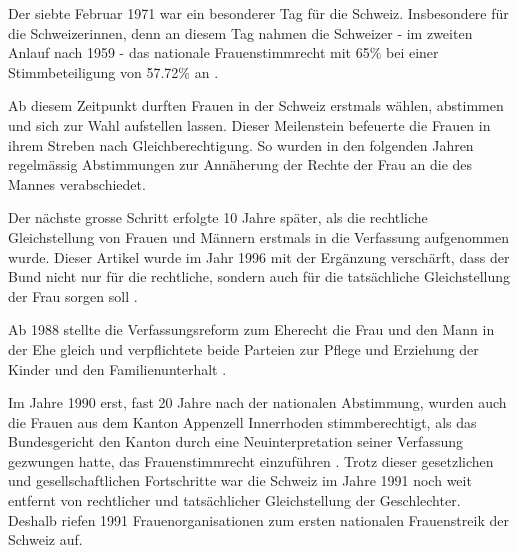 
Der siebte Februar 1971 war ein besonderer Tag für die Schweiz. Insbesondere für
die Schweizerinnen, denn an diesem Tag nahmen die Schweizer - im zweiten Anlauf nach 1959 - das
nationale Frauenstimmrecht mit 65\% bei einer Stimmbeteiligung von 57.72\% an
\cite{frauenstimmrecht}.

Ab diesem Zeitpunkt durften Frauen in der Schweiz erstmals wählen, abstimmen und sich zur Wahl
aufstellen lassen. Dieser Meilenstein befeuerte die Frauen in ihrem Streben nach Gleichberechtigung.
So wurden in den folgenden Jahren regelmässig Abstimmungen zur Annäherung der Rechte der Frau
an die des Mannes verabschiedet.

Der nächste grosse Schritt erfolgte 10 Jahre später, als die rechtliche Gleichstellung von Frauen und
Männern erstmals in die Verfassung aufgenommen wurde. Dieser Artikel wurde im Jahr 1996
mit der Ergänzung verschärft, dass der Bund nicht nur für die rechtliche, sondern auch für die
tatsächliche Gleichstellung der Frau sorgen soll
\cite{gleichstellung}.

Ab 1988 stellte die Verfassungsreform zum Eherecht die Frau und den Mann in der Ehe gleich und
verpflichtete beide Parteien zur Pflege und Erziehung der Kinder und den Familienunterhalt
\cite{eherecht}.

Im Jahre 1990 erst, fast 20 Jahre nach der nationalen Abstimmung, wurden auch die Frauen aus dem Kanton Appenzell Innerrhoden stimmberechtigt, als
das Bundesgericht den Kanton durch eine Neuinterpretation seiner Verfassung gezwungen hatte,
das Frauenstimmrecht einzuführen
\cite{frauenstimmrecht2}.
Trotz dieser gesetzlichen und gesellschaftlichen Fortschritte war die Schweiz im Jahre 1991 noch
weit entfernt von rechtlicher und tatsächlicher Gleichstellung der Geschlechter. 
Deshalb riefen 1991 Frauenorganisationen zum ersten nationalen Frauenstreik der Schweiz auf.

